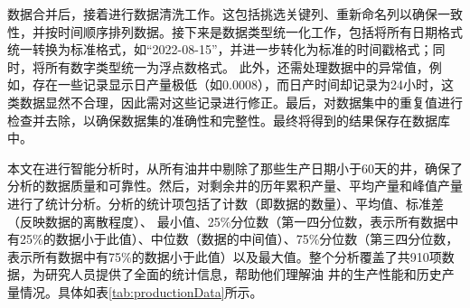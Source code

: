 数据合并后，接着进行数据清洗工作。这包括挑选关键列、重新命名列以确保一致性，并按时间顺序排列数据。接下来是数据类型统一化工作，包括将所有日期格式统一转换为标准格式，如“2022-08-15”，并进一步转化为标准的时间戳格式；同时，将所有数字类型统一为浮点数格式。
此外，还需处理数据中的异常值，例如，存在一些记录显示日产量极低（如0.0008），而日产时间却记录为24小时，这类数据显然不合理，因此需对这些记录进行修正。最后，对数据集中的重复值进行检查并去除，以确保数据集的准确性和完整性。最终将得到的结果保存在数据库中。

本文在进行智能分析时，从所有油井中剔除了那些生产日期小于60天的井，确保了分析的数据质量和可靠性。然后，对剩余井的历年累积产量、平均产量和峰值产量进行了统计分析。分析的统计项包括了计数（即数据的数量）、平均值、标准差（反映数据的离散程度）、
最小值、25\%分位数（第一四分位数，表示所有数据中有25\%的数据小于此值）、中位数（数据的中间值）、75\%分位数（第三四分位数，表示所有数据中有75\%的数据小于此值）以及最大值。整个分析覆盖了共910项数据，为研究人员提供了全面的统计信息，帮助他们理解油
井的生产性能和历史产量情况。具体如表\ref{tab:productionData}所示。
\begin{table}[H]
    \renewcommand{\arraystretch}{1.5} %
    \centering
    \caption{产量统计数据表}
    \label{tab:productionData}
\end{table}

